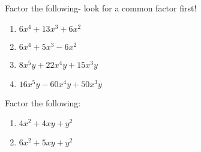 \begin{myexample}
Factor the following- look for a common factor first!
\begin{enumerate}
	\item $6x^4+13x^3+6x^2$
	\item $6x^4+5x^3-6x^2$
	\item $8x^5y+22x^4y+15x^3y$
	\item $16x^5y-60x^4y+50x^3y$
\end{enumerate}

Factor the following:
\begin{multicols}{2}
	\begin{enumerate}
		\item $4x^2+4xy+y^2$
		\item $6x^2+5xy+y^2$
	\end{enumerate}
\end{multicols}
\end{myexample}

